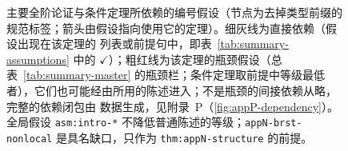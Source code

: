 \begin{figure}[htbp]
\caption{主要全阶论证与条件定理所依赖的编号假设（节点为去掉类型前缀的规范标签；箭头由假设指向使用它的定理）。细灰线为直接依赖（假设出现在该定理的 \texttt{\string\uses} 列表或前提句中，即表~\ref{tab:summary-assumptions} 中的 $\checkmark$）；粗红线为该定理的瓶颈假设（总表~\ref{tab:summary-master} 的瓶颈栏；条件定理取前提中等级最低者），它们也可能经由所用的陈述进入；不是瓶颈的间接依赖从略，完整的依赖闭包由 \texttt{\string\uses} 数据生成，见附录~P（\cref{fig:appP-dependency}）。全局假设 \texttt{asm:intro-*} 不降低普通陈述的等级；\texttt{appN-brst-nonlocal} 是具名缺口，只作为 \texttt{thm:appN-structure} 的前提。}
\label{fig:summary-hypotheses}
\end{figure}
